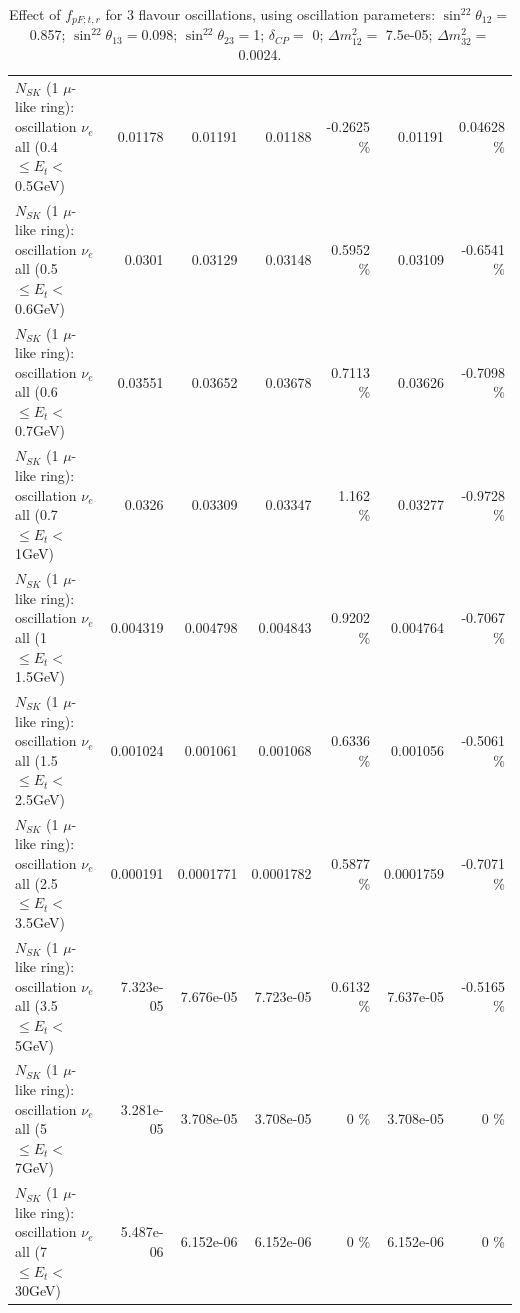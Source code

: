\begin{table}
\begin{tabular}{| l | r | r | r  r | r  r |}
$N_{SK}$ (1 $\mu$-like ring): oscillation $\nu_{e}$ all (0.4 $\leq E_{t} <$ 0.5GeV) &         0.01178 &         0.01191 &         0.01188 &  -0.2625 \%  &         0.01191 &  0.04628 \%  \\ 
$N_{SK}$ (1 $\mu$-like ring): oscillation $\nu_{e}$ all (0.5 $\leq E_{t} <$ 0.6GeV) &          0.0301 &         0.03129 &         0.03148 &   0.5952 \%  &         0.03109 &  -0.6541 \%  \\ 
$N_{SK}$ (1 $\mu$-like ring): oscillation $\nu_{e}$ all (0.6 $\leq E_{t} <$ 0.7GeV) &         0.03551 &         0.03652 &         0.03678 &   0.7113 \%  &         0.03626 &  -0.7098 \%  \\ 
$N_{SK}$ (1 $\mu$-like ring): oscillation $\nu_{e}$ all (0.7 $\leq E_{t} <$ 1GeV) &          0.0326 &         0.03309 &         0.03347 &    1.162 \%  &         0.03277 &  -0.9728 \%  \\ 
$N_{SK}$ (1 $\mu$-like ring): oscillation $\nu_{e}$ all (1 $\leq E_{t} <$ 1.5GeV) &        0.004319 &        0.004798 &        0.004843 &   0.9202 \%  &        0.004764 &  -0.7067 \%  \\ 
$N_{SK}$ (1 $\mu$-like ring): oscillation $\nu_{e}$ all (1.5 $\leq E_{t} <$ 2.5GeV) &        0.001024 &        0.001061 &        0.001068 &   0.6336 \%  &        0.001056 &  -0.5061 \%  \\ 
$N_{SK}$ (1 $\mu$-like ring): oscillation $\nu_{e}$ all (2.5 $\leq E_{t} <$ 3.5GeV) &        0.000191 &       0.0001771 &       0.0001782 &   0.5877 \%  &       0.0001759 &  -0.7071 \%  \\ 
$N_{SK}$ (1 $\mu$-like ring): oscillation $\nu_{e}$ all (3.5 $\leq E_{t} <$ 5GeV) &       7.323e-05 &       7.676e-05 &       7.723e-05 &   0.6132 \%  &       7.637e-05 &  -0.5165 \%  \\ 
 $N_{SK}$ (1 $\mu$-like ring): oscillation $\nu_{e}$ all (5 $\leq E_{t} <$ 7GeV) &       3.281e-05 &       3.708e-05 &       3.708e-05 &        0 \%  &       3.708e-05 &        0 \%  \\ 
$N_{SK}$ (1 $\mu$-like ring): oscillation $\nu_{e}$ all (7 $\leq E_{t} <$ 30GeV) &       5.487e-06 &       6.152e-06 &       6.152e-06 &        0 \%  &       6.152e-06 &        0 \%  \\ 
\hline
\hline
\end{tabular}
\caption{ Effect of $f_{pF; t, r}$ for 3 flavour oscillations, using oscillation parameters:  $\sin^22\theta_{12} = $0.857; $\sin^22\theta_{13} = $0.098; $\sin^22\theta_{23} = $1; $\delta_{CP} = $        0; $\Delta m^2_{12} = $    7.5e-05; $\Delta m^2_{32} = $    0.0024. }
\label{tab:num_xsec_pf_1RmuT_3f_osc_t13:0.098}
\end{table}
